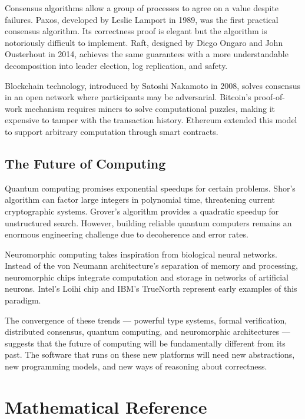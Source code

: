 \documentclass[11pt]{article}
\begin{document}
Consensus algorithms allow a group of processes to agree on a value despite
failures. Paxos, developed by Leslie Lamport in 1989, was the first
practical consensus algorithm. Its correctness proof is elegant but the
algorithm is notoriously difficult to implement. Raft, designed by Diego
Ongaro and John Ousterhout in 2014, achieves the same guarantees with a
more understandable decomposition into leader election, log replication,
and safety.

Blockchain technology, introduced by Satoshi Nakamoto in 2008, solves
consensus in an open network where participants may be adversarial.
Bitcoin's proof-of-work mechanism requires miners to solve computational
puzzles, making it expensive to tamper with the transaction history.
Ethereum extended this model to support arbitrary computation through
smart contracts.

\subsection{The Future of Computing}

Quantum computing promises exponential speedups for certain problems.
Shor's algorithm can factor large integers in polynomial time, threatening
current cryptographic systems. Grover's algorithm provides a quadratic
speedup for unstructured search. However, building reliable quantum
computers remains an enormous engineering challenge due to decoherence
and error rates.

Neuromorphic computing takes inspiration from biological neural networks.
Instead of the von Neumann architecture's separation of memory and
processing, neuromorphic chips integrate computation and storage in
networks of artificial neurons. Intel's Loihi chip and IBM's TrueNorth
represent early examples of this paradigm.

The convergence of these trends --- powerful type systems, formal
verification, distributed consensus, quantum computing, and neuromorphic
architectures --- suggests that the future of computing will be
fundamentally different from its past. The software that runs on these
new platforms will need new abstractions, new programming models, and
new ways of reasoning about correctness.

\newpage
\appendix
\section{Mathematical Reference}
\end{document}

